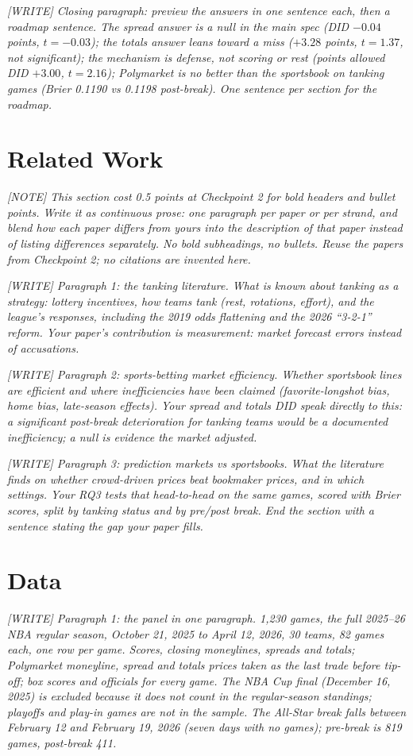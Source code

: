 \documentclass[12pt,letterpaper]{article}
\newcommand{\writeprompt}[1]{{\color{gray}\textit{[WRITE] #1}}}
\newcommand{\authnote}[1]{{\color{gray}\textit{[NOTE] #1}}}
\begin{document}
\writeprompt{Closing paragraph: preview the answers in one sentence each, then a
roadmap sentence. The spread answer is a null in the main spec (DID $-0.04$
points, $t=-0.03$); the totals answer leans toward a miss ($+3.28$ points,
$t=1.37$, not significant); the mechanism is defense, not scoring or rest
(points allowed DID $+3.00$, $t=2.16$); Polymarket is no better than the
sportsbook on tanking games (Brier 0.1190 vs 0.1198 post-break). One sentence
per section for the roadmap.}

\section{Related Work}

\authnote{This section cost 0.5 points at Checkpoint 2 for bold headers and
bullet points. Write it as continuous prose: one paragraph per paper or per
strand, and blend how each paper differs from yours into the description of
that paper instead of listing differences separately. No bold subheadings, no
bullets. Reuse the papers from Checkpoint 2; no citations are invented here.}

\writeprompt{Paragraph 1: the tanking literature. What is known about
tanking as a strategy: lottery incentives, how teams tank (rest, rotations,
effort), and the league's responses, including the 2019 odds flattening and
the 2026 ``3-2-1'' reform. Your paper's contribution is measurement: market
forecast errors instead of accusations.}

\writeprompt{Paragraph 2: sports-betting market efficiency. Whether
sportsbook lines are efficient and where inefficiencies have been claimed
(favorite-longshot bias, home bias, late-season effects). Your spread and
totals DID speak directly to this: a significant post-break deterioration
for tanking teams would be a documented inefficiency; a null is evidence
the market adjusted.}

\writeprompt{Paragraph 3: prediction markets vs sportsbooks. What the
literature finds on whether crowd-driven prices beat bookmaker prices, and
in which settings. Your RQ3 tests that head-to-head on the same games,
scored with Brier scores, split by tanking status and by pre/post break.
End the section with a sentence stating the gap your paper fills.}

\section{Data}

\writeprompt{Paragraph 1: the panel in one paragraph. 1,230 games, the full
2025--26 NBA regular season, October 21, 2025 to April 12, 2026, 30 teams,
82 games each, one row per game. Scores, closing moneylines, spreads and
totals; Polymarket moneyline, spread and totals prices taken as the last
trade before tip-off; box scores and officials for every game. The NBA Cup
final (December 16, 2025) is excluded because it does not count in the
regular-season standings; playoffs and play-in games are not in the sample.
The All-Star break falls between February 12 and February 19, 2026 (seven
days with no games); pre-break is 819 games, post-break 411.}
\end{document}
